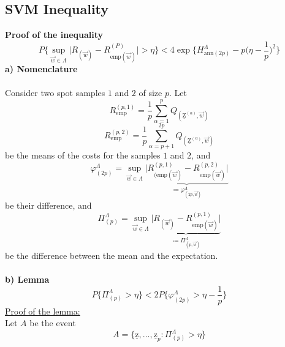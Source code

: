 \subsection{SVM Inequality}
{\bf Proof of the inequality}
\begin{equation}
	P\Bigg\{ \sup_{ \vec{w} \in \Lambda  }
		\Big| R_{ ( \vec{w} ) } -
		  R_{ \mathrm{emp} ( \vec{w} ) }^{ (P) }
		\Big| > \eta
	\Bigg\} < 4 \exp \Bigg\{ H_{ \mathrm{ann} (2p) }^\Lambda 
			- p\Big( \eta - \frac{1}{p} \Big)^2
	\Bigg\}
\end{equation}
{\bf a) Nomenclature} \\\\
\noindent Consider two spot samples $1$ and $2$ of size $p$. Let
\begin{equation}
	R_{ \mathrm{emp} }^{ (p, 1) } = \frac{1}{p}
		\sum_{ \alpha = 1 }^p 
		Q_{ ( \mathrm{ \underline{Z} }^{ (\alpha ) }, 
		\vec{w} ) } 
\end{equation}
\begin{equation}
	R_{ \mathrm{emp} }^{ (p, 2) } = \frac{1}{p}
		\sum_{ \alpha = p + 1 }^{2p} 
		Q_{ ( \mathrm{ \underline{Z} }^{ (\alpha ) }, 
		\vec{w} ) }
\end{equation}
be the means of the costs for the samples $1$ and $2$, and
\begin{equation}
	\varphi_{ (2p) }^\Lambda = 
		\sup_{ \vec{w} \in \Lambda  }
	\underbrace{ \Big| 
		R_{ (\mathrm{emp} ( \vec{w} )  }^{ (p, 1) }
	-	R_{ \mathrm{emp} ( \vec{w} ) }^{ (p, 2) }
		\Big| }_{ \coloneqq 
			\varphi_{ (2p,\vec{w} ) }^\Lambda }
\end{equation}
be their difference, and
\begin{equation}
	\Pi_{ (p) }^\Lambda = 
		\sup_{ \vec{w} \in \Lambda  }
	\underbrace{ \Big| 
		R_{ ( \vec{w} ) } -
		R_{ \mathrm{emp} ( \vec{w} ) }^{ (p, 1) }
		\Big| }_{\coloneqq 
			\Pi_{ (p,\vec{w} ) }^\Lambda }
\end{equation}
be the difference between the mean and the expectation.\\\\
{\bf b) Lemma}
\begin{equation}
	P\Bigg\{ \Pi_{ (p) }^\Lambda > \eta \Bigg\}
	< 2P\Bigg\{ \varphi_{ (2p) }^\Lambda > \eta - \frac{1}{p} \Bigg\}
\end{equation}
\underline{Proof of the lemma:}\\
Let $A$ be the event
\begin{equation}
	A = \Big\{ \mathrm{ \underline{z} }, \ldots, 
		\mathrm{ \underline{z} }_p: 
		\Pi_{ (p) }^\Lambda > \eta\Big\}
\end{equation}
